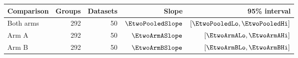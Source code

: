 \begin{tabular}{lrrrr}
\toprule
Comparison & Groups & Datasets & Slope & 95\% interval \\
\midrule
Both arms & 292 & 50 & $\EtwoPooledSlope$ & $[\EtwoPooledLo,\EtwoPooledHi]$ \\
Arm A & 292 & 50 & $\EtwoArmASlope$ & $[\EtwoArmALo,\EtwoArmAHi]$ \\
Arm B & 292 & 50 & $\EtwoArmBSlope$ & $[\EtwoArmBLo,\EtwoArmBHi]$ \\
\bottomrule
\end{tabular}
